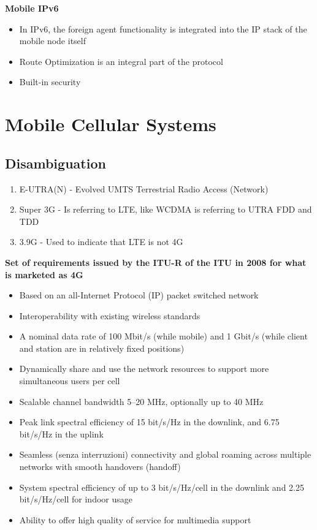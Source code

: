 \textbf{Mobile IPv6}

\begin{itemize}
  \item In IPv6, the foreign agent functionality is integrated into the IP
stack of the mobile node itself
  \item Route Optimization is an integral part of the protocol
  \item Built-in security
\end{itemize}

\section{Mobile Cellular Systems}

\subsection{Disambiguation}

\begin{enumerate}
  \item E-UTRA(N) - Evolved UMTS Terrestrial Radio Access (Network)
  \item Super 3G - Is referring to LTE, like WCDMA is referring to UTRA FDD and
TDD
  \item 3.9G - Used to indicate that LTE is not 4G
\end{enumerate}

\textbf{Set of requirements issued by the ITU-R of the ITU in 2008 for what is
marketed as 4G}

\begin{itemize}
  \item Based on an all-Internet Protocol (IP) packet switched network
  \item Interoperability with existing wireless standards
  \item A nominal data rate of 100 Mbit/s (while mobile) and 1 Gbit/s (while
client and station are in relatively fixed positions)
  \item Dynamically share and use the network resources to support more
simultaneous users per cell
  \item Scalable channel bandwidth 5–20 MHz, optionally up to 40 MHz
  \item Peak link spectral efficiency of 15 bit/s/Hz in the downlink, and 6.75
bit/s/Hz in the uplink
  \item Seamless (senza interruzioni) connectivity and global roaming across
multiple networks with smooth handovers (handoff)
  \item System spectral efficiency of up to 3 bit/s/Hz/cell in the downlink and
2.25 bit/s/Hz/cell for indoor usage
  \item Ability to offer high quality of service for multimedia support
\end{itemize}

